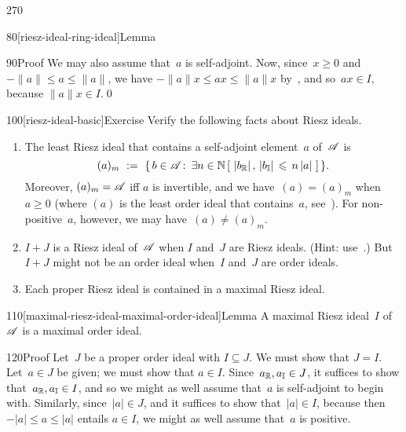 \begin{parsec}{270}
\begin{point}{80}[riesz-ideal-ring-ideal]{Lemma}
\begin{point}{90}{Proof}
We may also assume that~$a$ is self-adjoint.
Now, since~$x\geq 0$ and $-\|a\|\leq a\leq \|a\|$,
we have $-\|a\|x \leq ax\leq \|a\|x$
by~,
and so~$ax\in I$,
because $\|a\|x\in I$.\qed
\end{point}
\end{point}
\begin{point}{100}[riesz-ideal-basic]{Exercise}%
Verify the following facts about Riesz ideals.
\begin{enumerate}
\item
The least Riesz ideal that contains a self-adjoint element~$a$
of~$\mathscr{A}$ is
\begin{equation*}
(a)_m\ :=\ \{\,b\in \mathscr{A}\colon\, 
\exists n\in \mathbb{N}\,[\ \left|b_{\mathbb{R}}\right|,\,\left|b_{\mathbb{I}}\right|
\,\leqslant\, n\left|a\right| \ ]\,\}.
\end{equation*}
Moreover,  $(a)_m=\mathscr{A}$ iff $a$ is invertible,
and we have~$(a)=(a)_m$ when~$a\geq 0$
(where $(a)$ is the least order ideal that contains~$a$,
see~).
For non-positive~$a$, however, we may have~$(a)\neq (a)_m$.
\item
$I+J$ is a Riesz ideal of~$\mathscr{A}$
when $I$ and~$J$ are Riesz ideals. (Hint: use~.)
But~$I+J$ might not be an order ideal
when~$I$ and~$J$ are order ideals.

\item
Each proper Riesz ideal is contained in a maximal Riesz ideal.
\end{enumerate}%
\spacingfix%
\end{point}%
\begin{point}{110}[maximal-riesz-ideal-maximal-order-ideal]{Lemma}%
A maximal Riesz ideal~$I$ of~$\mathscr{A}$
is a maximal order ideal.
\begin{point}{120}{Proof}%
Let~$J$ be a proper order ideal with $I\subseteq J$.
We must show that $J=I$.
Let~$a\in J$ be given;
we must show that $a\in I$.
Since~$a_{\mathbb{R}},a_{\mathbb{I}}\in J$,
it suffices to show that~$a_{\mathbb{R}},a_{\mathbb{I}}\in I$,
and so we might as well assume that~$a$ is self-adjoint
to begin with.
Similarly,
since~$\left|a\right|\in J$,
and it suffices to show that~$\left|a\right|\in I$,
because then $-\left|a\right|\leq a\leq \left|a\right|$
entails $a\in I$,
we might as well assume that~$a$ is positive.


\end{point}
\end{point}
\end{parsec}
